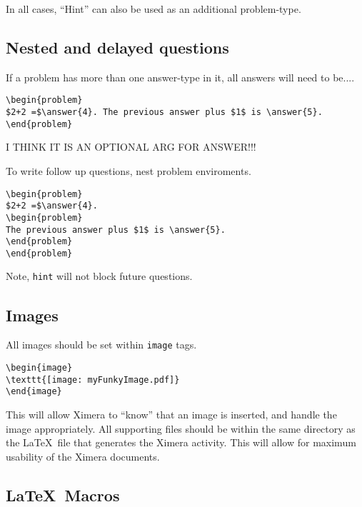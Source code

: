 \documentclass{article}
\begin{document}
In all cases, ``Hint'' can also be used as an additional problem-type.


\subsection*{Nested and delayed questions}


If a problem has more than one answer-type in it, all answers will
need to be....

\begin{verbatim}
\begin{problem}
$2+2 =$\answer{4}. The previous answer plus $1$ is \answer{5}.  
\end{problem}
\end{verbatim}

I THINK IT IS AN OPTIONAL ARG FOR ANSWER!!!


To write follow up questions, nest problem enviroments.

\begin{verbatim}
\begin{problem}
$2+2 =$\answer{4}. 
\begin{problem}
The previous answer plus $1$ is \answer{5}.  
\end{problem}
\end{problem}
\end{verbatim}
Note, \verb|hint| will not block future questions.



\subsection*{Images}

All images should be set within \verb|image| tags.
\begin{verbatim}
\begin{image}
\texttt{[image: myFunkyImage.pdf]}
\end{image}
\end{verbatim}
This will allow Ximera to ``know'' that an image is inserted, and
handle the image appropriately. All supporting files should be within
the same directory as the \LaTeX\ file that generates the Ximera
activity. This will allow for maximum usability of the Ximera
documents.

\subsection*{\LaTeX\ Macros}
\end{document}

